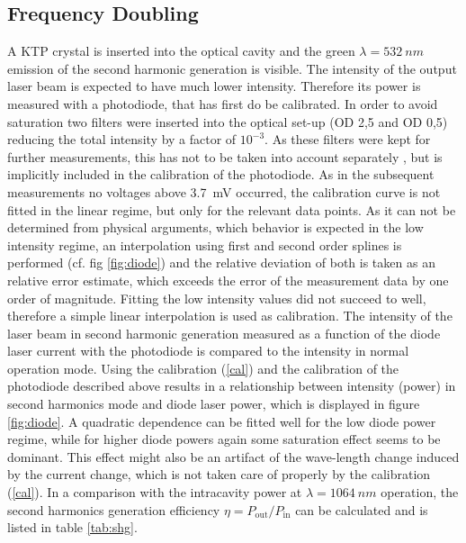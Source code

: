 \documentclass[a4paper]{scrartcl}
\numberwithin{equation}{section}
\numberwithin{figure}{section}
\numberwithin{table}{section}
\newcommand{\Formel}[1]{(\ref{#1})}
\begin{document}
\subsection{Frequency Doubling}
A KTP crystal is inserted into the optical cavity and the green $\lambda =\SI{532}{nm}$ emission of the second harmonic generation is visible. The intensity of the output laser beam is expected to have much lower intensity. Therefore its power is measured with a photodiode, that has first do be calibrated. In order to avoid saturation two filters were inserted into the optical set-up (OD 2,5 and OD 0,5) reducing the total intensity by a factor of $10^{-3}$. As these filters were kept for further measurements, this has not to be taken into account separately , but is implicitly included in the calibration of the photodiode. As in the subsequent measurements no voltages above \SI{3.7}{mV} occurred, the calibration curve is not fitted in the linear regime, but only for the relevant data points. As it can not be determined from physical arguments, which behavior is expected in the low intensity regime, an interpolation using first and second order splines is performed (cf. fig \ref{fig:diode}) and the relative deviation of both is taken as an relative error estimate, which exceeds the error of the measurement data by one order of magnitude. Fitting the low intensity values did not succeed to well, therefore a simple linear interpolation is used as calibration. The intensity of the laser beam in second harmonic generation measured as a function of the diode laser current with the photodiode is compared to the intensity in normal operation mode. Using the calibration \Formel{cal} and the calibration of the photodiode described above results in a relationship between intensity (power) in second harmonics mode and diode laser power, which is displayed in figure \ref{fig:diode}. A quadratic dependence can be fitted well for the low diode power regime, while for higher diode powers again some saturation effect seems to be dominant. This effect might also be an artifact of the wave-length change induced by the current change, which is not taken care of properly by the calibration \Formel{cal}. In a comparison with the intracavity power at $\lambda=\SI{1064}{nm}$ operation, the second harmonics generation efficiency $\eta=P_\text{out}/P_\text{in}$ can be calculated and is listed in table \ref{tab:shg}.
\end{document}
